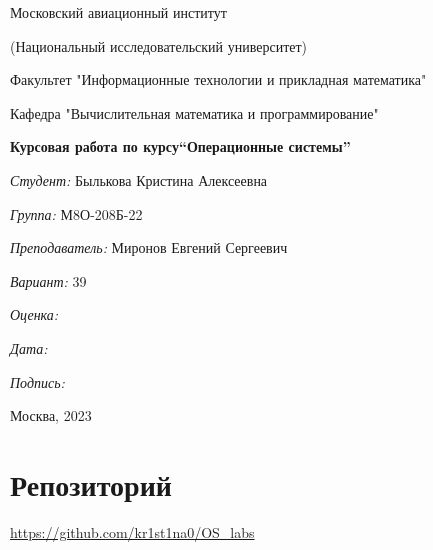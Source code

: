 \documentclass[a4paper, 12pt]{article}
\begin{document}
\thispagestyle{empty}	
\begin{center}
	Московский авиационный институт
	
	(Национальный исследовательский университет)
	
	Факультет "Информационные технологии и прикладная математика"
	
	Кафедра "Вычислительная математика и программирование"
	
\end{center}
\vspace{40ex}
\begin{center}
	\textbf{\large{Курсовая работа по курсу\linebreak \textquotedblleft Операционные системы\textquotedblright}}
\end{center}
\vspace{35ex}
\begin{flushright}
	\textit{Студент: } Былькова Кристина Алексеевна
	
	\vspace{2ex}
	\textit{Группа: } М8О-208Б-22
	
	\vspace{2ex}
	\textit{Преподаватель: } Миронов Евгений Сергеевич
	
	\vspace{2ex}
	\textit{Вариант: } 39
	
	\vspace{2ex}
	\textit{Оценка: } \underline{\quad\quad\quad\quad\quad\quad}
	
	 \vspace{2ex}
	\textit{Дата: } \underline{\quad\quad\quad\quad\quad\quad}
	
	\vspace{2ex}
	\textit{Подпись: } \underline{\quad\quad\quad\quad\quad\quad}
	
\end{flushright}

\vspace{5ex}

\begin{vfill}
	\begin{center}
		Москва, 2023
	\end{center}	
\end{vfill}
\newpage

\begingroup
\color{black}
\tableofcontents\newpage
\endgroup

\section{Репозиторий}
\href{https://github.com/kr1st1na0/OS\_labs}{https://github.com/kr1st1na0/OS\_labs}
\end{document}
